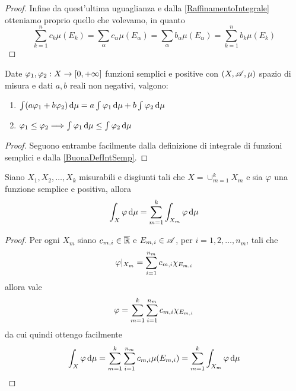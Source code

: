 \begin{proof}
	Infine da quest'ultima uguaglianza e dalla \cref{RaffinamentoIntegrale} otteniamo proprio quello che volevamo, in quanto
	\begin{equation*}
		\sum_{k=1}^n c_k \mu(E_k)=\sum_\alpha c_\alpha\mu(E_\alpha)=\sum_\alpha b_\alpha\mu(E_\alpha)=\sum_{k=1}^n b_k \mu(E_k)
	\end{equation*}
\end{proof}

\begin{proposition}\label{prop:IntegraleSemplici}
	Date $\varphi_1,\varphi_2:X\to[0,+\infty]$ funzioni semplici e positive con $(X,\mathscr A,\mu)$ spazio di misura e dati $a,b$ reali non negativi, valgono:
	\begin{enumerate}
		\item $\int (a\varphi_1+b\varphi_2)\,\mathrm d\mu=a\int \varphi_1\,\mathrm d\mu+b\int \varphi_2\,\mathrm d\mu$ \label{PIS:add}
		\item $\varphi_1\le \varphi_2\Longrightarrow \int \varphi_1\,\mathrm d\mu\le \int \varphi_2\,\mathrm d\mu$ \label{PIS:mono}
	\end{enumerate}
\end{proposition}
\begin{proof}
	Seguono entrambe facilmente dalla definizione di integrale di funzioni semplici e dalla \cref{BuonaDefIntSemp}.
\end{proof}

\begin{proposition}\label{prop:IntegraleSempliciSpezzato}
	Siano $X_1,X_2,\dots,X_k$ misurabili e disgiunti tali che $X=\cup_{m=1}^kX_m$ e sia $\varphi$ una funzione semplice e positiva, allora
	\begin{equation*}
		\int_X \varphi \,\mathrm d \mu=\sum_{m=1}^k \int_{X_m}\varphi\,\mathrm d \mu
	\end{equation*}
\end{proposition}
\begin{proof}
	Per ogni $X_m$ siano $c_{m,i}\in\overline{\mathbb R}$ e $E_{m,i}\in\mathscr A$, per $i=1,2,\dots,n_m$, tali che 
	\begin{equation*}
		\varphi|_{X_m}=\sum_{i=1}^{n_m}c_{m,i}\chi_{E_{m,i}}
	\end{equation*}
	allora vale
	\begin{equation*}
		\varphi=\sum_{m=1}^k\sum_{i=1}^{n_m}c_{m,i}\chi_{E_{m,i}}
	\end{equation*}
	da cui quindi ottengo facilmente
	\begin{equation*}
		\int_X \varphi \,\mathrm d \mu=\sum_{m=1}^k\sum_{i=1}^{n_m}c_{m,i}\mu(E_{m,i})=\sum_{m=1}^k\int_{X_m}\varphi\,\mathrm d \mu
	\end{equation*}

\end{proof}



